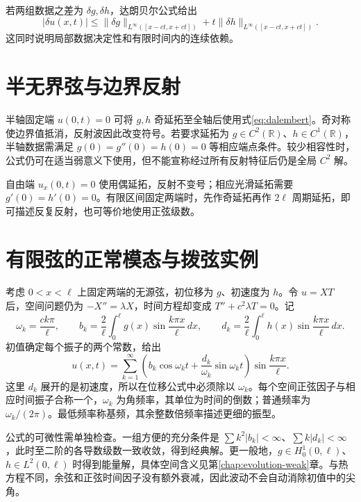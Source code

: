 \documentclass[UTF8,12pt,a4paper,fontset=fandol]{ctexbook}
\begin{document}
若两组数据之差为 $\delta g,\delta h$，达朗贝尔公式给出
\[
 |\delta u(x,t)|\le\|\delta g\|_{L^\infty([x-ct,x+ct])}
 +t\|\delta h\|_{L^\infty([x-ct,x+ct])}.
\]
这同时说明局部数据决定性和有限时间内的连续依赖。

\section{半无界弦与边界反射}
半轴固定端 $u(0,t)=0$ 可将 $g,h$ 奇延拓至全轴后使用式\eqref{eq:dalembert}。奇对称使边界值抵消，反射波因此改变符号。若要求延拓为 $g\in C^2(\mathbb R)$、$h\in C^1(\mathbb R)$，半轴数据需满足 $g(0)=g''(0)=h(0)=0$ 等相应端点条件。较少相容性时，公式仍可在适当弱意义下使用，但不能宣称经过所有反射特征后仍是全局 $C^2$ 解。

自由端 $u_x(0,t)=0$ 使用偶延拓，反射不变号；相应光滑延拓需要 $g'(0)=h'(0)=0$。有限区间固定两端时，先作奇延拓再作 $2\ell$ 周期延拓，即可描述反复反射，也可等价地使用正弦级数。

\section{有限弦的正常模态与拨弦实例}
\label{sec:finite-string}
考虑 $0<x<\ell$ 上固定两端的无源弦，初位移为 $g$、初速度为 $h$。令 $u=X T$ 后，空间问题仍为 $-X''=\lambda X$，时间方程却变成 $T''+c^2\lambda T=0$。记
\[
 \omega_k=\frac{ck\pi}{\ell},\qquad
 b_k=\frac2\ell\int_0^\ell g(x)\sin\frac{k\pi x}{\ell}\,dx,
 \qquad d_k=\frac2\ell\int_0^\ell h(x)\sin\frac{k\pi x}{\ell}\,dx.
\]
初值确定每个振子的两个常数，给出
\begin{equation}
 u(x,t)=\sum_{k=1}^\infty
 \left(b_k\cos\omega_kt+\frac{d_k}{\omega_k}\sin\omega_kt\right)
 \sin\frac{k\pi x}{\ell}.
 \label{eq:finite-wave-modes}
\end{equation}
这里 $d_k$ 展开的是初速度，所以在位移公式中必须除以 $\omega_k$。每个空间正弦因子与相应时间振子合称一个，$\omega_k$ 为角频率，其单位为时间的倒数；普通频率为 $\omega_k/(2\pi)$。最低频率称基频，其余整数倍频率描述更细的振型。

公式的可微性需单独检查。一组方便的充分条件是 $\sum k^2|b_k|<\infty$、$\sum k|d_k|<\infty$，此时至二阶的各导数级数一致收敛，得到经典解。更一般地，$g\in H_0^1(0,\ell)$、$h\in L^2(0,\ell)$ 时得到能量解，具体空间含义见第\ref{chap:evolution-weak}章。与热方程不同，余弦和正弦时间因子没有额外衰减，因此波动不会自动消除初值中的尖角。
\end{document}
